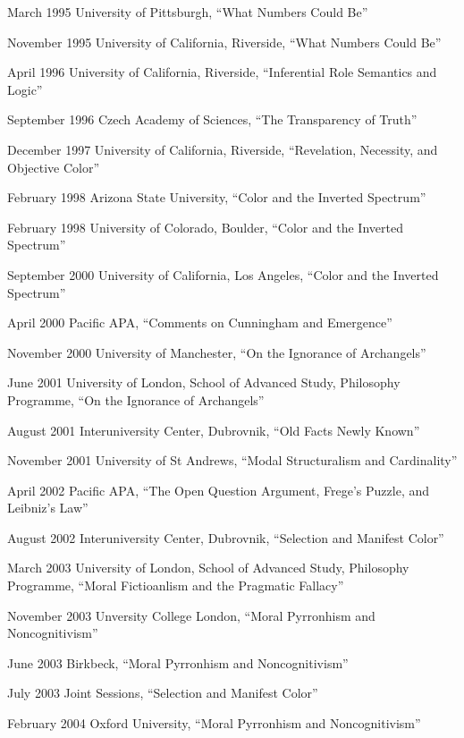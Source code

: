 \documentclass[contbibnum]{cv}
\begin{document}
\begin{topic}
    \item[March 1995] University of Pittsburgh, ``What Numbers Could Be''
    \item[November 1995] University of California, Riverside, ``What Numbers Could Be''
    \item[April 1996] University of California, Riverside, ``Inferential Role Semantics and Logic''
    \item[September 1996] Czech Academy of Sciences, ``The Transparency of Truth''
    \item[December 1997] University of California, Riverside, ``Revelation, Necessity, and Objective Color''
    \item[February 1998] Arizona State University, ``Color and the Inverted Spectrum''
    \item[February 1998] University of Colorado, Boulder, ``Color and the Inverted Spectrum''
    \item[September 2000] University of California, Los Angeles, ``Color and the Inverted Spectrum''
    \item[April 2000] Pacific APA, ``Comments on Cunningham and Emergence''
    \item[November 2000] University of Manchester, ``On the Ignorance of Archangels''
    \item[June 2001] University of London, School of Advanced Study, Philosophy Programme, ``On the Ignorance of Archangels''
    \item[August 2001] Interuniversity Center, Dubrovnik, ``Old Facts Newly Known''
    \item[November 2001] University of St Andrews, ``Modal Structuralism and Cardinality''
    \item[April 2002] Pacific APA, ``The Open Question Argument, Frege's Puzzle, and Leibniz's Law''
    \item[August 2002] Interuniversity Center, Dubrovnik, ``Selection and Manifest Color'' 
    \item[March 2003] University of London, School of Advanced Study, Philosophy Programme, ``Moral Fictioanlism and the Pragmatic Fallacy''
    \item[November 2003] Unversity College London, ``Moral Pyrronhism and Noncognitivism''
    \item[June 2003] Birkbeck, ``Moral Pyrronhism and Noncognitivism''
    \item[July 2003] Joint Sessions, ``Selection and Manifest Color''
    \item[February 2004] Oxford University, ``Moral Pyrronhism and Noncognitivism''

\end{topic}
\end{document}
